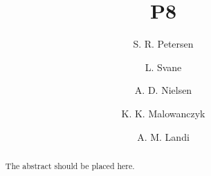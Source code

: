 \documentclass{llncs}
\begin{document}
\title{P8}
\author{S. R. Petersen \and L. Svane \and A. D. Nielsen \and K. K. Malowanczyk \and A. M. Landi}

\maketitle

\begin{abstract}
	The abstract should be placed here.
\end{abstract}





\end{document}
